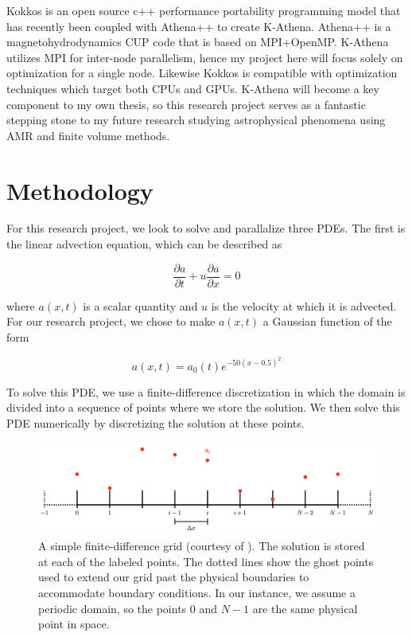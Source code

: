 \documentclass{article}
\begin{document}
Kokkos is an open source c++ performance portability programming model that has recently been coupled with Athena++ to create K-Athena.
Athena++ is a magnetohydrodynamics CUP code that is based on MPI+OpenMP.
K-Athena utilizes MPI for inter-node parallelism, hence my project here will focus solely on optimization for a single node.
Likewise Kokkos is compatible with optimization techniques which target both CPUs and GPUs.
K-Athena will become a key component to my own thesis, so this research project serves as a fantastic stepping stone to my future research studying astrophysical phenomena using AMR and finite volume methods.

\section{Methodology}

For this research project, we look to solve and parallalize three PDEs. The first is the linear advection equation, which can be described as 

\begin{equation}
 \frac{\partial a}{\partial t} + u \frac{\partial a}{\partial x} = 0
\end{equation}

where $a(x,t)$ is a scalar quantity and $u$ is the velocity at which it is advected. For our research project, we chose to make $a(x,t)$ a Gaussian function of the form 

\begin{equation}
a(x,t) = a_0(t) e^{- 50 (x - 0.5)^2 }
\end{equation}

To solve this PDE, we use a finite-difference discretization in which the domain is divided into a sequence of points where we store the solution. We then solve this PDE numerically by discretizing the solution at these points.





\begin{figure}[h]
\centering
\includegraphics[width=1.0\textwidth]{Finite_Difference_Grid.png}
\caption{A simple finite-difference grid (courtesy of \cite{zingale_2020}). The solution is stored at each of the labeled points. The dotted lines show the ghost points used to extend our grid past the physical boundaries to accommodate boundary conditions. In our instance, we assume a periodic domain, so the points $0$ and $N-1$ are the same physical point in space.}
\label{Finite_Difference_Grid}
\end{figure}
\end{document}
